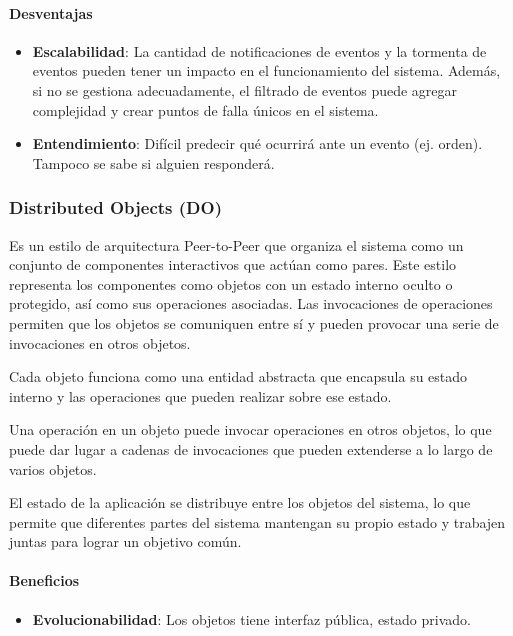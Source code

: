 \documentclass{article}
\begin{document}
			\paragraph{Desventajas}
				\begin{itemize}	
					
					\item {\textbf{Escalabilidad}}: La cantidad de notificaciones de eventos y la tormenta de 
					eventos pueden tener un impacto en el funcionamiento del sistema. Además, si no se gestiona adecuadamente, el filtrado de eventos puede agregar complejidad y crear puntos de falla únicos en el sistema.
								
					\item {\textbf{Entendimiento}}: Difícil predecir qué ocurrirá ante un evento (ej. orden).
					Tampoco se sabe si alguien responderá.			
					
				\end{itemize}
			
			
			\subsubsection{Distributed Objects (DO)}
			Es un estilo de arquitectura Peer-to-Peer que organiza el sistema como un conjunto de componentes interactivos que actúan como pares. Este estilo representa los componentes como objetos con un estado interno oculto o protegido, así como sus operaciones asociadas. Las invocaciones de operaciones permiten que los objetos se comuniquen entre sí y pueden provocar una serie de invocaciones en otros objetos.
			
	 		Cada objeto funciona como una entidad abstracta que encapsula su estado interno y las operaciones que pueden realizar sobre ese estado. 
	 		
	 		Una operación en un objeto puede invocar operaciones en otros objetos, lo que puede dar lugar a cadenas de invocaciones que pueden extenderse a lo largo de varios objetos.
	 		
	 		El estado de la aplicación se distribuye entre los objetos del sistema, lo que permite que diferentes partes del sistema mantengan su propio estado y trabajen juntas para lograr un objetivo común.
	 		
			\paragraph{Beneficios}
				\begin{itemize}	
					\item {\textbf{Evolucionabilidad}}: Los objetos tiene interfaz pública, estado privado.
				
					
				\end{itemize}
			
\end{document}
